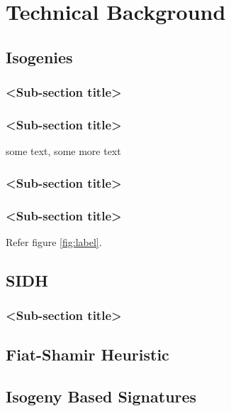\chapter{Technical Background}

\section{Isogenies}

\subsection{<Sub-section title>}

\subsection{<Sub-section title>}
some text\cite{citation-2-name-here}, some more text
\subsection{<Sub-section title>}

\subsection{<Sub-section title>}

Refer figure \ref{fig:label}.

\section{SIDH}



\subsection{<Sub-section title>}


\section{Fiat-Shamir Heuristic}

\section{Isogeny Based Signatures}

